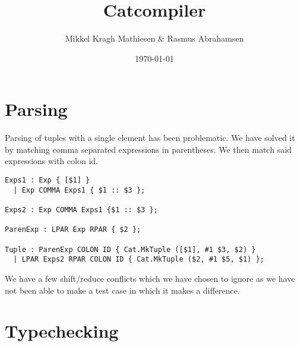 \documentclass{article}
\author{Mikkel Kragh Mathiesen \& Rasmus Abrahamsen}
\title{Catcompiler}
\date{\today}
\begin{document}
\maketitle

\section{Parsing}

Parsing of tuples with a single element has been problematic. We have solved it by matching comma separated expressions in parentheses. We then match said expressions with colon id.

\begin{lstlisting}
Exps1 : Exp { [$1] }
  | Exp COMMA Exps1 { $1 :: $3 };

Exps2 : Exp COMMA Exps1 {$1 :: $3 };

ParenExp : LPAR Exp RPAR { $2 };

Tuple : ParenExp COLON ID { Cat.MkTuple ([$1], #1 $3, $2) }
  | LPAR Exps2 RPAR COLON ID { Cat.MkTuple ($2, #1 $5, $1) };
\end{lstlisting}

We have a few shift/reduce conflicts which we have chosen to ignore as we have not been able to make a test case in which it makes a difference.

\section{Typechecking}
\end{document}
